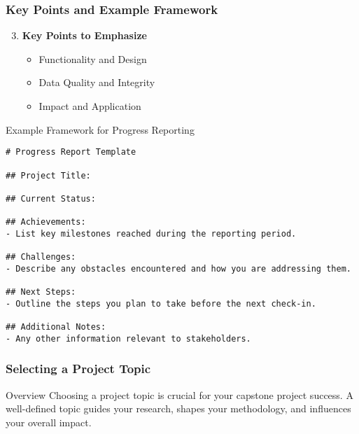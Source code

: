\documentclass[aspectratio=169]{beamer}
\begin{document}
\begin{frame}[fragile]
    \frametitle{Key Points and Example Framework}
    \begin{enumerate}
        \setcounter{enumi}{2}
        \item \textbf{Key Points to Emphasize}
        \begin{itemize}
            \item Functionality and Design
            \item Data Quality and Integrity
            \item Impact and Application
        \end{itemize}
    \end{enumerate}
    
    \begin{block}{Example Framework for Progress Reporting}
        \begin{lstlisting}
# Progress Report Template

## Project Title:

## Current Status:

## Achievements:
- List key milestones reached during the reporting period.

## Challenges:
- Describe any obstacles encountered and how you are addressing them.

## Next Steps:
- Outline the steps you plan to take before the next check-in.

## Additional Notes:
- Any other information relevant to stakeholders.
        \end{lstlisting}
    \end{block}
\end{frame}

\begin{frame}[fragile]
    \frametitle{Selecting a Project Topic}
    \begin{block}{Overview}
        Choosing a project topic is crucial for your capstone project success. A well-defined topic guides your research, shapes your methodology, and influences your overall impact.
    \end{block}
\end{frame}
\end{document}
